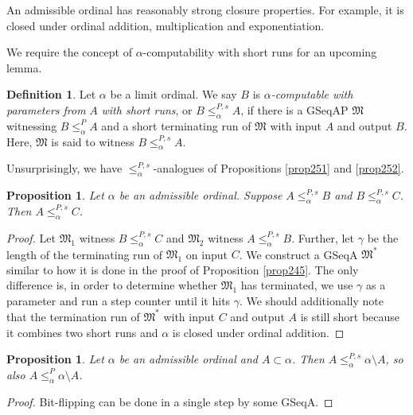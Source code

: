 \documentclass[12pt, twoside]{memoir}
\numberwithin{equation}{section}
\newtheorem{prop}[thm]{Proposition}
\theoremstyle{definition}
\newtheorem{defi}[thm]{Definition}
\theoremstyle{remark}
\theoremstyle{definition}
\theoremstyle{definition}
\theoremstyle{definition}
\theoremstyle{remark}
\begin{document}
An admissible ordinal has reasonably strong closure properties. For example, it is closed under ordinal addition, multiplication and exponentiation.

We require the concept of $\alpha$-computability with short runs for an upcoming lemma.

\begin{defi}\label{def269p}
Let $\alpha$ be a limit ordinal. We say $B$ is $\alpha$\emph{-computable with parameters from} $A$ \emph{with short runs}, or $B \leq^{P, s}_{\alpha} A$, if there is a GSeqAP $\mathfrak{M}$ witnessing $B \leq^P_{\alpha} A$ and a short terminating run of $\mathfrak{M}$ with input $A$ and output $B$. Here, $\mathfrak{M}$ is said to witness $B \leq^{P, s}_{\alpha} A$.
\end{defi}

Unsurprisingly, we have $\leq^{P, s}_{\alpha}$-analogues of Propositions \ref{prop251} and \ref{prop252}.

\begin{prop}\label{prop270n}
Let $\alpha$ be an admissible ordinal. Suppose $A \leq^{P, s}_{\alpha} B$ and $B \leq^{P, s}_{\alpha} C$. Then $A \leq^{P, s}_{\alpha} C$.
\end{prop}

\begin{proof}
Let $\mathfrak{M}_1$ witness $B \leq^{P, s}_{\alpha} C$ and $\mathfrak{M}_2$ witness $A \leq^{P, s}_{\alpha} B$. Further, let $\gamma$ be the length of the terminating run of $\mathfrak{M}_1$ on input $C$. We construct a GSeqA $\mathfrak{M}^*$ similar to how it is done in the proof of Proposition \ref{prop245}. The only difference is, in order to determine whether $\mathfrak{M}_1$ has terminated, we use $\gamma$ as a parameter and run a step counter until it hits $\gamma$. We should additionally note that the termination run of $\mathfrak{M}^*$ with input $C$ and output $A$ is still short because it combines two short runs and $\alpha$ is closed under ordinal addition.
\end{proof}

\begin{prop}\label{prop270o}
Let $\alpha$ be an admissible ordinal and $A \subset \alpha$. Then $A \leq^{P, s}_{\alpha} \alpha \setminus A$, so also $A \leq^{P}_{\alpha} \alpha \setminus A$.
\end{prop}

\begin{proof}
Bit-flipping can be done in a single step by some GSeqA.
\end{proof}
\end{document}
